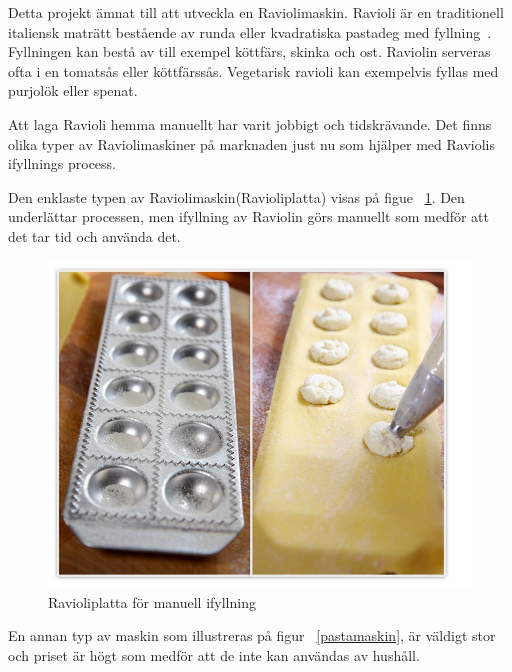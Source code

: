 Detta projekt ämnat till att utveckla en Raviolimaskin. Ravioli är en traditionell italiensk maträtt bestående av runda eller kvadratiska pastadeg med fyllning~\cite{engproc}. Fyllningen kan bestå av till exempel köttfärs, skinka och ost. Raviolin serveras ofta i en tomatsås eller köttfärssås. Vegetarisk ravioli kan exempelvis fyllas med purjolök eller spenat.

Att laga Ravioli hemma manuellt har varit jobbigt och tidskrävande. Det finns olika typer av Raviolimaskiner på marknaden just nu som hjälper med Raviolis ifyllnings process. 

Den enklaste typen av Raviolimaskin(Ravioliplatta) visas på figue ~\ref{ravioliplatta}. Den underlättar processen, men ifyllning av Raviolin görs manuellt som medför att det tar tid och använda det.

 
	\begin{figure}[h]
		\begin{center}
			\includegraphics[scale=0.5]{images/raviolimoldwithfilling.jpg}
			\caption{Ravioliplatta för manuell ifyllning}
			\label{ravioliplatta}	
		\end{center}
	\end{figure}
En annan typ av maskin som illustreras på figur ~\ref{pastamaskin}, är väldigt stor och priset är högt som medför att de inte kan användas av hushåll.

